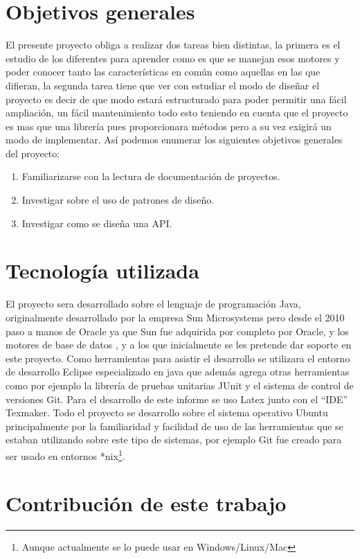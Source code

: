 \section{Objetivos generales}
El presente proyecto obliga a realizar dos tareas bien distintas, la primera es el estudio de los diferentes \dd para aprender como es que se manejan esos motores y poder conocer tanto las características en común como aquellas en las que difieran, la segunda tarea tiene que ver con estudiar el modo de diseñar el proyecto es decir de que modo estará estructurado \jj para poder permitir una fácil ampliación, un fácil mantenimiento todo esto teniendo en cuenta que el proyecto es mas que una librería pues proporcionara métodos pero a su vez exigirá un modo de implementar. Así podemos enumerar los siguientes objetivos generales del proyecto:
\begin{enumerate}
\item Familiarizarse con la lectura de documentación de proyectos.
\item Investigar sobre el uso de patrones de diseño.
\item Investigar como se diseña una API.
\end{enumerate}
%
\section{Tecnología utilizada}
El proyecto sera desarrollado sobre el lenguaje de programación Java, originalmente desarrollado por la empresa Sun Microsystems pero desde el 2010 paso a manos de Oracle ya que Sun fue adquirida por completo por Oracle, y los motores de base de datos \m, \p y \s a los que inicialmente se les pretende dar soporte en este proyecto. Como herramientas para asistir el desarrollo se utilizara el entorno de desarrollo Eclipse especializado en java que además agrega otras herramientas como por ejemplo la librería de pruebas unitarias JUnit y el sistema de control de versiones Git. Para el desarrollo de este informe se uso Latex junto con el ``IDE'' Texmaker. Todo el proyecto se desarrollo sobre el sistema operativo Ubuntu principalmente por la familiaridad y facilidad de uso de las herramientas que se estaban utilizando sobre este tipo de sistemas, por ejemplo Git fue creado para ser usado en entornos *nix\footnote{Aunque actualmente se lo puede usar en Windows/Linux/Mac}.
%
\section{Contribución de este trabajo}
%
%
%
